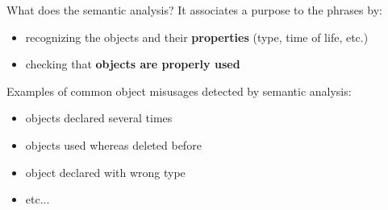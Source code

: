 \documentclass{beamer}[10pt, usepdftitle=false, handout]
\begin{document}
	\begin{frame}
	
	\begin{block}{What does the semantic analysis?}
	It associates a purpose to the phrases by:
	\begin{itemize}
	\item{recognizing the objects and their \textbf{properties} (type, time of life, etc.)}
	\item{checking that \textbf{objects are properly used}}
	\end{itemize}		
	\end{block}	
	\vspace*{1em}
	Examples of common object misusages detected by semantic analysis:
	\vspace*{1em}
	\begin{itemize}
	\item{objects declared several times}
	\item{objects used whereas deleted before}
	\item{object declared with wrong type}
	\item{etc...}
	\end{itemize}		
	
	\end{frame}
\end{document}
